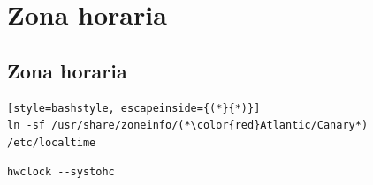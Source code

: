 \section{Zona horaria}
\subsection{Zona horaria}

  \begin{tcolorbox}[title=Establecemos la zona horaria que es {\color{red}Atlántico/Canarias}]
    \begin{lstlisting}[style=bashstyle, escapeinside={(*}{*)}]
ln -sf /usr/share/zoneinfo/(*\color{red}Atlantic/Canary*) /etc/localtime
    \end{lstlisting}
\end{tcolorbox}

\begin{tcolorbox}[title=A continuación ejecutamos]
    \begin{lstlisting}[style=bashstyle]
hwclock --systohc
    \end{lstlisting}
\end{tcolorbox}
\newpage
